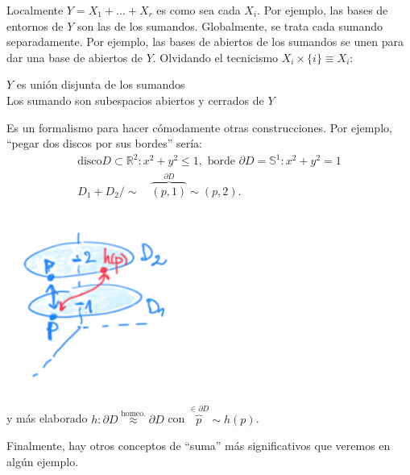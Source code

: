 \begin{pg}
Localmente $Y = X_1 + \ldots + X_r$ es como sea cada $X_i$. Por ejemplo, las bases de entornos de $Y$ son las de los sumandos. Globalmente, se trata cada sumando separadamente. Por ejemplo, las bases de abiertos de los sumandos se unen para dar una base de abiertos de $Y$. Olvidando el tecnicismo $X_i \times \{i\} \equiv X_i$:
\begin{center}
   $Y$ es unión disjunta de los sumandos\\
   Los sumando son subespacios abiertos y cerrados de $Y$
\end{center}
Es un formalismo para hacer cómodamente otras construcciones. Por ejemplo, ``pegar dos discos por sus bordes'' sería:
\begin{gather*}
    \text{disco} D \subset \mathbb{R}^2: x^2 + y^2 \le 1, \text{ borde } \partial D = \mathbb{S}^1: x^2 + y^2 = 1\\
    D_1 + D_2 / \sim\quad \overbrace{\left( p, 1 \right)}^{\partial D} \sim \left( p, 2 \right) 
.\end{gather*}
\begin{center}    
    \includegraphics[scale=0.3]{images/pg_top_sum} 
\end{center}
y más elaborado $h: \partial D \stackrel{\text{homeo.}}{\approx} \partial D$ con $\overbrace{p}^{\in \partial D} \sim h\left( p \right)$.

Finalmente, hay otros conceptos de ``suma'' más significativos que veremos en algún ejemplo.
\end{pg}


